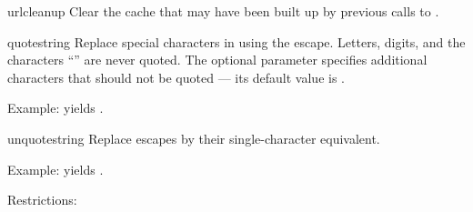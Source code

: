 \begin{funcdesc}{urlcleanup}{}
Clear the cache that may have been built up by previous calls to
.
\end{funcdesc}

\begin{funcdesc}{quote}{string}
Replace special characters in  using the  escape.
Letters, digits, and the characters ``'' are never quoted.
The optional  parameter specifies additional characters
that should not be quoted --- its default value is .

Example:  yields .
\end{funcdesc}

\begin{funcdesc}{unquote}{string}
Replace  escapes by their single-character equivalent.

Example:  yields .
\end{funcdesc}

Restrictions:

